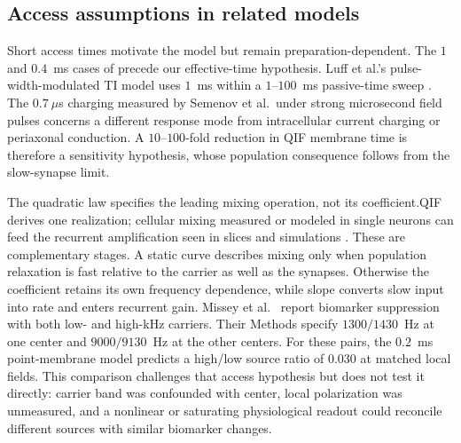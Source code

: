 \documentclass[11pt,a4paper]{article}
\providecommand{\DIFaddtex}[1]{{\protect\color{blue} \sf #1}} %
\providecommand{\DIFdeltex}[1]{{\protect\color{red} \scriptsize #1}} %
\providecommand{\DIFaddbegin}{} %
\providecommand{\DIFaddend}{} %
\providecommand{\DIFdelbegin}{} %
\providecommand{\DIFdelend}{} %
\providecommand{\DIFadd}[1]{\texorpdfstring{\DIFaddtex{#1}}{#1}} %
\providecommand{\DIFdel}[1]{\texorpdfstring{\DIFdeltex{#1}}{}} %
\begin{document}
\subsection{Access assumptions in related models}
Short access times motivate the model but remain preparation-dependent.
The $1$ and $0.4$~ms cases of \cite{esmaeilpour2021} precede our effective-time
hypothesis. Luff et al.'s pulse-width-modulated TI model uses $1$~ms within a
$1$--$100$~ms passive-time sweep \cite{luff2024}. The $0.7~\mu$s charging
measured by Semenov et al.\ under strong microsecond field pulses
\cite{semenov2025} concerns a different response mode from intracellular
current charging or periaxonal conduction. A $10$--$100$-fold reduction in
QIF membrane time is therefore a sensitivity hypothesis, whose population
consequence follows from the slow-synapse limit.

\fi

\DIFdelbegin \DIFdel{The quadratic law specifies the leading mixing operation, not its coefficient.QIF derives one realization; cellular mixing measured or modeled in single
neurons \cite{mirzakhalili2020,luff2024mixer} can feed the recurrent
amplification seen in slices and simulations \cite{caldas2024,karimi2024}. These are complementary stages. A static curve describes mixing only when
population relaxation is fast relative to the carrier as well as the synapses. Otherwise the coefficient retains its own frequency dependence, while slope
converts slow input into rate and enters recurrent gain.
}\DIFdelend \DIFaddbegin \DIFadd{Missey et al.\ \cite{missey2026} report biomarker suppression with both
low- and high-kHz carriers. Their Methods specify $1300/1430$~Hz at one
center and $9000/9130$~Hz at the other centers. For these pairs, the
$0.2$~ms point-membrane model predicts a high/low source ratio of $0.030$
at matched local fields. This comparison challenges that access hypothesis
but does not test it directly: carrier band was confounded with center,
local polarization was unmeasured, and a nonlinear or saturating physiological
readout could reconcile different sources with similar biomarker changes.
}\DIFaddend
\end{document}
